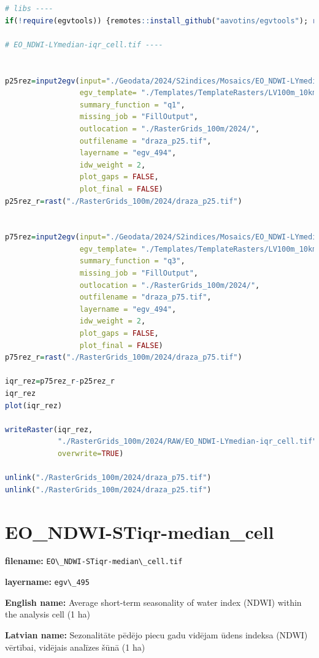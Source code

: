 \documentclass[
]{book}
\newcommand{\passthrough}[1]{#1}
\begin{document}
\begin{lstlisting}[language=R]
# libs ----
if(!require(egvtools)) {remotes::install_github("aavotins/egvtools"); require(egvtools)}

# EO_NDWI-LYmedian-iqr_cell.tif ----


p25rez=input2egv(input="./Geodata/2024/S2indices/Mosaics/EO_NDWI-LYmedian.tif",
                 egv_template= "./Templates/TemplateRasters/LV100m_10km.tif",
                 summary_function = "q1",
                 missing_job = "FillOutput",
                 outlocation = "./RasterGrids_100m/2024/",
                 outfilename = "draza_p25.tif",
                 layername = "egv_494",
                 idw_weight = 2,
                 plot_gaps = FALSE,
                 plot_final = FALSE)
p25rez_r=rast("./RasterGrids_100m/2024/draza_p25.tif")


p75rez=input2egv(input="./Geodata/2024/S2indices/Mosaics/EO_NDWI-LYmedian.tif",
                 egv_template= "./Templates/TemplateRasters/LV100m_10km.tif",
                 summary_function = "q3",
                 missing_job = "FillOutput",
                 outlocation = "./RasterGrids_100m/2024/",
                 outfilename = "draza_p75.tif",
                 layername = "egv_494",
                 idw_weight = 2,
                 plot_gaps = FALSE,
                 plot_final = FALSE)
p75rez_r=rast("./RasterGrids_100m/2024/draza_p75.tif")

iqr_rez=p75rez_r-p25rez_r
iqr_rez
plot(iqr_rez)

writeRaster(iqr_rez,
            "./RasterGrids_100m/2024/RAW/EO_NDWI-LYmedian-iqr_cell.tif",
            overwrite=TRUE)

unlink("./RasterGrids_100m/2024/draza_p75.tif")
unlink("./RasterGrids_100m/2024/draza_p25.tif")
\end{lstlisting}

\section{EO\_NDWI-STiqr-median\_cell}\label{ch06.495}

\textbf{filename:} \passthrough{\lstinline!EO\_NDWI-STiqr-median\_cell.tif!}

\textbf{layername:} \passthrough{\lstinline!egv\_495!}

\textbf{English name:} Average short-term seasonality of water index (NDWI) within the analysis cell (1 ha)

\textbf{Latvian name:} Sezonalitāte pēdējo piecu gadu vidējam ūdens indeksa (NDWI) vērtībai, vidējais analīzes šūnā (1 ha)
\end{document}
